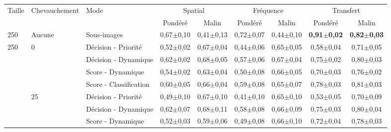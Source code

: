 \begin{landscape}
\begin{table}[]
    \centering
    \begin{tabular}{lllcccccc}
		\toprule
		\multirow{2}{*}{Taille}     & \multirow{2}{*}{Chevauchement}& \multirow{2}{*}{Mode}     & \multicolumn{2}{c}{Spatial}               & \multicolumn{2}{c}{Fréquence}             & \multicolumn{2}{c}{Transfert}                 \\
		                            &                               &                           & Pondéré               & Malin             & Pondéré               & Malin             & Pondéré               & Malin                 \\ \midrule
		250                         & Aucune                        & Sous-images               & 0,67$\pm$0,10         & 0,41$\pm$0,13     & 0,72$\pm$0,07         & 0,44$\pm$0,10     & \textbf{0,91$\pm$0,02}& \textbf{0,82$\pm$0,03}\\ \midrule
		\multirow{12}{*}{250}       & \multirow{4}{*}{0}            & Décision - Priorité       & 0,52$\pm$0,02         & 0,67$\pm$0,04     & 0,44$\pm$0,06         & 0,65$\pm$0,05     & 0,58$\pm$0,04         & 0,71$\pm$0,05         \\ 
							        &                               & Décision - Dynamique      & 0,62$\pm$0,02         & 0,68$\pm$0,05     & 0,57$\pm$0,06         & 0,67$\pm$0,04     & 0,75$\pm$0,02         & 0,80$\pm$0,03         \\
							        &                               & Score - Dynamique         & 0,54$\pm$0,02         & 0,63$\pm$0,04     & 0,50$\pm$0,08         & 0,66$\pm$0,05     & 0,70$\pm$0,03         & 0,76$\pm$0,02         \\
							        &                               & Score - Classification    & 0,60$\pm$0,05         & 0,66$\pm$0,04     & 0,59$\pm$0,08         & 0,65$\pm$0,07     & 0,78$\pm$0,03         & 0,81$\pm$0,03         \\ \cline{2-9}
							        & \multirow{4}{*}{25}           & Décision - Priorité       & 0,49$\pm$0,10         & 0,67$\pm$0,10     & 0,41$\pm$0,10         & 0,65$\pm$0,10     & 0,53$\pm$0,05         & 0,70$\pm$0,09         \\
							        &                               & Décision - Dynamique      & 0,62$\pm$0,07         & 0,68$\pm$0,11     & 0,58$\pm$0,08         & 0,66$\pm$0,09     & 0,75$\pm$0,03         & 0,80$\pm$0,04         \\
							        &                               & Score - Dynamique         & 0,52$\pm$0,03         & 0,59$\pm$0,06     & 0,49$\pm$0,08         & 0,66$\pm$0,10     & 0,72$\pm$0,04         & 0,78$\pm$0,03         \\

\end{tabular}
\end{table}
\end{landscape}
